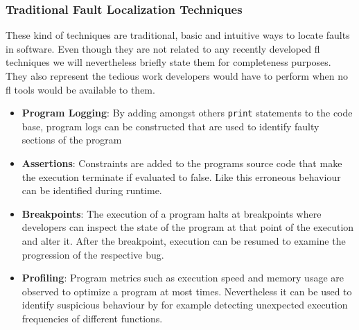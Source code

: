 \documentclass[
fancyheadings, %
%
%
]{stsreprt}
\begin{document}
\subsubsection{Traditional Fault Localization Techniques}
These kind of techniques are traditional, basic and intuitive ways to locate faults in software. Even though they are not related to any recently developed \acrshort{fl} techniques we will nevertheless briefly state them for completeness purposes. They also represent the tedious work developers would have to perform when no \acrshort{fl} tools would be available to them. 
\begin{itemize}
    \item \textbf{Program Logging}: By adding amongst others \texttt{print} statements to the code base, program logs can be constructed that are used to identify faulty sections of the program 
    \item \textbf{Assertions}: Constraints are added to the programs source code that make the execution terminate if evaluated to false. 
    Like this erroneous behaviour can be identified during runtime.
    \item \textbf{Breakpoints}: The execution of a program halts at breakpoints where developers can inspect the state of the program at that point of the execution and alter it. 
    After the breakpoint, execution can be resumed to examine the progression of the respective bug.
    \item \textbf{Profiling}: Program metrics such as execution speed and memory usage are observed to optimize a program at most times. 
    Nevertheless it can be used to identify suspicious behaviour by for example detecting unexpected execution frequencies of different functions. 
\end{itemize}
\end{document}
